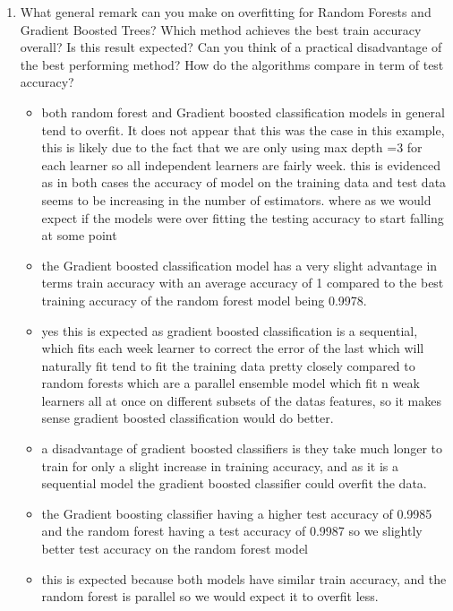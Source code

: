 \documentclass{article}
\theoremstyle{plain}
\theoremstyle{definition}
\begin{document}
\begin{enumerate}
\item What general remark can you make on overfitting for Random Forests and Gradient Boosted Trees? Which method achieves the best train accuracy overall? Is this result expected? 
Can you think of a practical disadvantage of the best performing method? How do the algorithms compare in term of test accuracy? \\
\begin{itemize}
    \color{blue}
    \item both random forest and Gradient boosted classification models in general tend to overfit. It does not appear that this was the case in this example, this is likely due to the fact that we are only using max depth =3 for each learner so all independent learners are fairly week. this is evidenced as in both cases the accuracy of model on the training data and test data seems to be increasing in the number of estimators. where as we would expect if the models were over fitting the testing accuracy to start falling at some point 
    \item the Gradient boosted classification model has a very slight  advantage in terms train accuracy with an average accuracy of 1 compared to the best training accuracy of the random forest model being 0.9978.
    \item yes this is expected as gradient boosted classification is a sequential, which fits each week learner to correct the error of the last which will naturally fit tend to fit the training data pretty closely compared to random forests which are a parallel ensemble model which fit n weak learners all at once on different subsets of the datas features, so it makes sense gradient boosted classification would do better. 
    \item a disadvantage of gradient boosted classifiers is they take much longer to train for only a slight increase in training accuracy, and as it is a sequential model the gradient boosted classifier could overfit the data.  
    \item the Gradient boosting classifier having a higher test accuracy of 0.9985 and the random forest having a test accuracy of 0.9987 so we slightly better test accuracy on the random forest model
    \item this is expected because both models have similar train accuracy, and the random forest is parallel so we would expect it to overfit less. 
\end{itemize}


\setcounter{saveenum}{\value{enumi}}
\end{enumerate}
\end{document}
